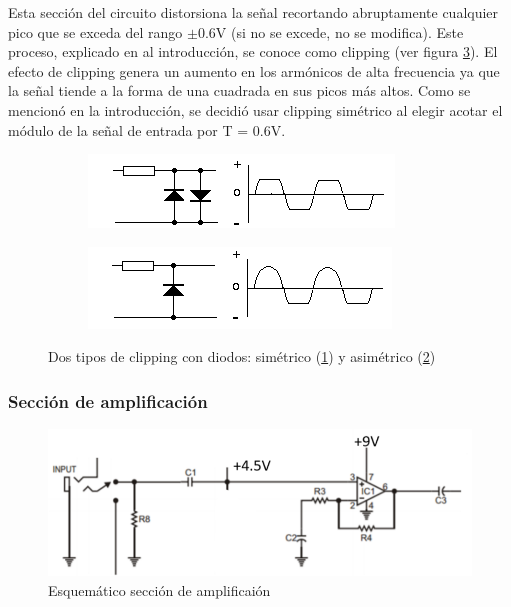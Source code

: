 \documentclass[../../main.tex]{subfiles}
\begin{document}
Esta secci\'on del circuito distorsiona la se\~nal recortando abruptamente cualquier pico que se exceda del rango $\pm$0.6V (si no se excede, no se modifica). Este proceso, explicado en al introducción, se conoce como clipping (ver figura \ref{fig:ej5_diode_clipping}).
El efecto de clipping genera un aumento en los arm\'onicos de alta frecuencia ya que la se\~nal tiende a la forma de una cuadrada en sus picos más altos. Como se mencionó en la introducción, se decidi\'o usar clipping sim\'etrico al elegir acotar el módulo de la señal de entrada por T = 0.6V.

\begin{figure}[H]		%
	\centering
	\begin{subfigure}[b]{0.45\textwidth}
		\centering
		\includegraphics[scale=.8]{imagenes/diode_clipping_symmetrical.png}
		\caption{}
		\label{fig:ej5_diode_clipping_sym}
	\end{subfigure}
	\begin{subfigure}[b]{0.45\textwidth}
		\centering
		\includegraphics[scale=.8]{imagenes/diode_clipping_asymmetrical.png}
		\caption{ }
		\label{fig:ej5_diode_clipping_asym}
	\end{subfigure}
	\caption{Dos tipos de clipping con diodos: sim\'etrico (\ref{fig:ej5_diode_clipping_sym}) y asim\'etrico (\ref{fig:ej5_diode_clipping_asym})}
	\label{fig:ej5_diode_clipping}
\end{figure}

\subsubsection{Secci\'on de amplificaci\'on}

\begin{figure}[H]	%
	\centering
	\includegraphics[scale=1]{imagenes/esquematico_amplificacion.png}
	\caption{Esquem\'atico secci\'on de amplificai\'on}
	\label{fig:ej5_esquematico_amplificacion}
\end{figure}
\end{document}
